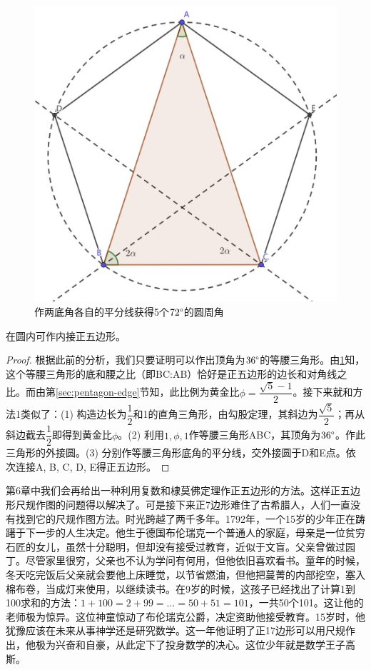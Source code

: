 \documentclass[b5paper]{ctexart}
\begin{document}
\begin{figure}[htbp]
 \centering
 \includegraphics[scale=0.35]{img/triangle-pentagon}
 \caption{作两底角各自的平分线获得5个$72\degree$的圆周角}
 \label{fig:triangle-pentagon}
\end{figure}

\begin{proposition}[欧几里得《原本》，卷4，命题11]
在圆内可作内接正五边形。
\end{proposition}

\begin{proof}
根据此前的分析，我们只要证明可以作出顶角为$36\degree$的等腰三角形。由\cref{fig:triangle-pentagon}知，这个等腰三角形的底和腰之比（即BC:AB）恰好是正五边形的边长和对角线之比。而由第\ref{sec:pentagon-edge}节知，此比例为黄金比$\phi = \dfrac{\sqrt{5} - 1}{2}$。接下来就和方法1类似了：(1) 构造边长为$\dfrac{1}{2}$和1的直角三角形，由勾股定理，其斜边为$\dfrac{\sqrt{5}}{2}$；再从斜边截去$\dfrac{1}{2}$即得到黄金比$\phi$。(2) 利用$1, \phi, 1$作等腰三角形ABC，其顶角为$36\degree$。作此三角形的外接圆。(3) 分别作等腰三角形底角的平分线，交外接圆于D和E点。依次连接A, B, C, D, E得正五边形。
\end{proof}

第6章中我们会再给出一种利用复数和棣莫佛定理作正五边形的方法。这样正五边形尺规作图的问题得以解决了。可是接下来正7边形难住了古希腊人，人们一直没有找到它的尺规作图方法。时光跨越了两千多年。1792年，一个15岁的少年正在踌躇于下一步的人生决定。他生于德国布伦瑞克一个普通人的家庭，母亲是一位贫穷石匠的女儿，虽然十分聪明，但却没有接受过教育，近似于文盲。父亲曾做过园丁。尽管家里很穷，父亲也不认为学问有何用，但他依旧喜欢看书。童年的时候，冬天吃完饭后父亲就会要他上床睡觉，以节省燃油，但他把蔓菁的内部挖空，塞入棉布卷，当成灯来使用，以继续读书。在9岁的时候，这孩子已经找出了计算1到100求和的方法：$1 + 100 = 2 + 99 = \dotso = 50 + 51 = 101$，一共50个101。这让他的老师极为惊异。这位神童惊动了布伦瑞克公爵，决定资助他接受教育。15岁时，他犹豫应该在未来从事神学还是研究数学。这一年他证明了正17边形可以用尺规作出\cite{Gauss-Britannia-2025}，他极为兴奋和自豪，从此定下了投身数学的决心。这位少年就是数学王子高斯。
\end{document}
